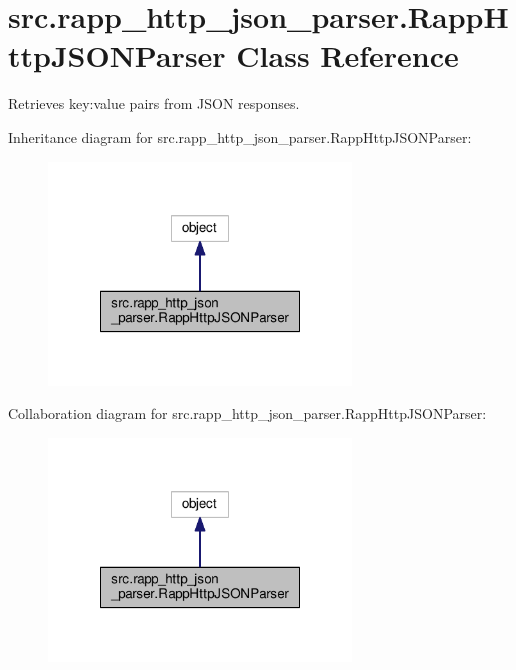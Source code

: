 \hypertarget{classsrc_1_1rapp__http__json__parser_1_1RappHttpJSONParser}{\section{src.\-rapp\-\_\-http\-\_\-json\-\_\-parser.\-Rapp\-Http\-J\-S\-O\-N\-Parser Class Reference}
\label{classsrc_1_1rapp__http__json__parser_1_1RappHttpJSONParser}
}


Retrieves key\-:value pairs from J\-S\-O\-N responses.  




Inheritance diagram for src.\-rapp\-\_\-http\-\_\-json\-\_\-parser.\-Rapp\-Http\-J\-S\-O\-N\-Parser\-:
\nopagebreak
\begin{figure}[H]
\begin{center}
\leavevmode
\includegraphics[width=228pt]{classsrc_1_1rapp__http__json__parser_1_1RappHttpJSONParser__inherit__graph}
\end{center}
\end{figure}


Collaboration diagram for src.\-rapp\-\_\-http\-\_\-json\-\_\-parser.\-Rapp\-Http\-J\-S\-O\-N\-Parser\-:
\nopagebreak
\begin{figure}[H]
\begin{center}
\leavevmode
\includegraphics[width=228pt]{classsrc_1_1rapp__http__json__parser_1_1RappHttpJSONParser__coll__graph}
\end{center}
\end{figure}
